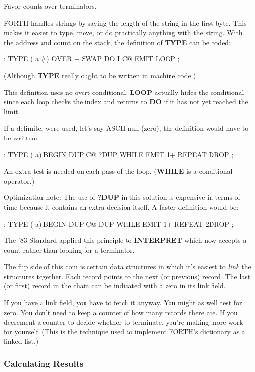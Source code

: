 \begin{tip}
Favor counts over terminators.
\end{tip}
FORTH handles strings by saving the length of the string in the first
byte. This makes it easier to type, move, or do practically anything with
the string. With the address and count on the stack, the definition of
\textbf{TYPE} can be coded:

\begin{Code}
: TYPE  ( a #)  OVER + SWAP DO  I C@ EMIT  LOOP ;
\end{Code}
(Although \textbf{TYPE} really ought to be written in machine code.)

This definition uses no overt conditional. \textbf{LOOP} actually hides the
conditional since each loop checks the index and returns to \textbf{DO} if it
has not yet reached the limit.

If a delimiter were used, let's say ASCII null (zero), the definition
would have to be written:

\begin{Code}
: TYPE  ( a)  BEGIN DUP C@  ?DUP WHILE  EMIT  1+
   REPEAT  DROP ;
\end{Code}
An extra test is needed on each pass of the loop. (\textbf{WHILE} is a conditional
operator.)

Optimization note: The use of \textbf{?DUP} in this solution is expensive in
terms of time because it contains an extra decision itself. A faster
definition would be:

\begin{Code}
: TYPE  ( a)  BEGIN DUP C@  DUP WHILE EMIT 1+
    REPEAT  2DROP ;
\end{Code}
The '83 Standard applied this principle to \textbf{INTERPRET} which now accepts
a count rather than looking for a terminator.

The flip side of this coin is certain data structures in which it's
easiest to \emph{link} the structures together. Each record points to the next
(or previous) record. The last (or first) record in the chain can be indicated
with a zero in its link field.

If you have a link field, you have to fetch it anyway. You might as
well test for zero. You don't need to keep a counter of how many records
there are. If you decrement a counter to decide whether to terminate,
you're making more work for yourself. (This is the technique used to
implement FORTH's dictionary as a linked list.)

\subsubsection{Calculating Results}

